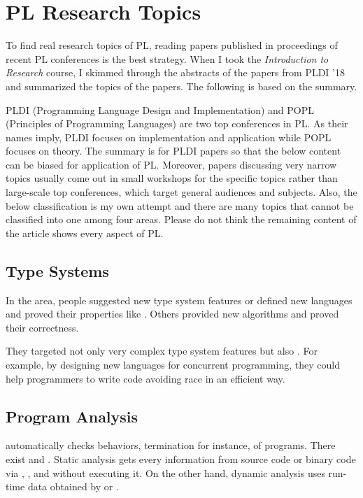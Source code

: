 \section{PL Research Topics}

To find real research topics of PL, reading papers published in proceedings of recent PL conferences is
the best strategy. When I took the \textit{Introduction to Research} course, I
skimmed through the abstracts of the papers from PLDI '18 and summarized the
topics of the papers. The following is based on the summary.

PLDI (Programming Language Design and Implementation) and POPL (Principles of
Programming Languages) are two top conferences in PL. As their names imply,
PLDI focuses on implementation and application while POPL focuses on theory.
The summary is for PLDI papers so that the below content can be biased for
application of PL. Moreover, papers discussing very narrow topics usually come
out in small workshops for the specific topics rather than large-scale top
conferences, which target general audiences and subjects. Also, the below
classification is my own attempt and there are many topics that cannot be
classified into one among four areas. Please do not think the remaining
content of the article shows every aspect of PL.

\subsection{Type Systems}

In the  area, people suggested new type system features or defined new languages and
proved their properties like . Others provided new  algorithms and proved their correctness.

They targeted not only very complex type system features but also . For example, by designing new languages for concurrent
programming, they could help programmers to write code avoiding race in an efficient way.

\subsection{Program Analysis}

 automatically checks behaviors, termination for instance, of programs. There
exist  and . Static analysis gets every
information from source code or binary code via , , and  without executing it. On the other
hand, dynamic analysis uses run-time data obtained by  or .

